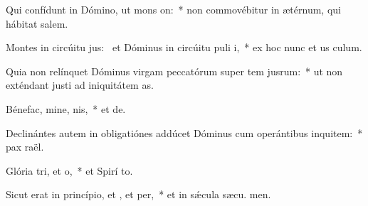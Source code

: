 \item Qui confídunt in Dómino, ut mons on:~* non commovébitur in ætérnum, qui hábitat  salem.
\item Montes in circúitu jus:~\pscross{} et Dóminus in circúitu puli i,~* ex hoc nunc et us  culum.
\item Quia non relínquet Dóminus virgam peccatórum super tem jusrum:~* ut non exténdant justi ad iniquitátem  as.
\item Bénefac, mine, nis,~* et  de.
\item Declinántes autem in obligatiónes addúcet Dóminus cum operántibus inquitem:~* pax  raël.
\item Glória tri, et o,~* et Spirí to.
\item Sicut erat in princípio, et , et per,~* et in sǽcula sæcu. men.
